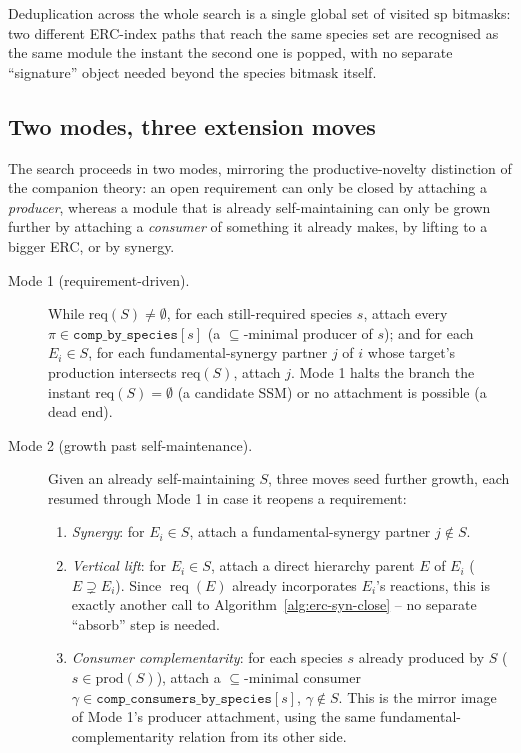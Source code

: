 \documentclass[11pt]{article}
\theoremstyle{plain}
\theoremstyle{remark}
\newcommand{\req}{\operatorname{req}}
\begin{document}
Deduplication across the whole search is a single global set of visited
$\mathrm{sp}$ bitmasks: two different ERC-index paths that reach the same
species set are recognised as the same module the instant the second one
is popped, with no separate ``signature'' object needed beyond the species
bitmask itself.

\subsection{Two modes, three extension moves}
\label{subsec:moves}

The search proceeds in two modes, mirroring the productive-novelty
distinction of the companion theory: an open requirement can only be
closed by attaching a \emph{producer}, whereas a module that is already
self-maintaining can only be grown further by attaching a
\emph{consumer} of something it already makes, by lifting to a bigger
ERC, or by synergy.

\begin{description}
\item[Mode 1 (requirement-driven).] While $\mathrm{req}(S)\neq\emptyset$,
for each still-required species $s$, attach every
$\pi\in\texttt{comp\_by\_species}[s]$ (a $\subseteq$-minimal producer of
$s$); and for each $E_i\in S$, for each fundamental-synergy partner $j$ of
$i$ whose target's production intersects $\mathrm{req}(S)$, attach $j$.
Mode 1 halts the branch the instant $\mathrm{req}(S)=\emptyset$
(a candidate SSM) or no attachment is possible (a dead end).
\item[Mode 2 (growth past self-maintenance).] Given an already
self-maintaining $S$, three moves seed further growth, each resumed
through Mode 1 in case it reopens a requirement:
\begin{enumerate}
\item \emph{Synergy}: for $E_i\in S$, attach a fundamental-synergy
partner $j\notin S$.
\item \emph{Vertical lift}: for $E_i\in S$, attach a direct hierarchy
parent $E$ of $E_i$ ($E\supsetneq E_i$). Since $\req(E)$ already
incorporates $E_i$'s reactions, this is exactly another call to
Algorithm~\ref{alg:erc-syn-close} -- no separate ``absorb'' step is
needed.
\item \emph{Consumer complementarity}: for each species $s$ already
produced by $S$ ($s\in\mathrm{prod}(S)$), attach a $\subseteq$-minimal
consumer $\gamma\in\texttt{comp\_consumers\_by\_species}[s]$,
$\gamma\notin S$. This is the mirror image of Mode 1's producer
attachment, using the same fundamental-complementarity relation from its
other side.
\end{enumerate}
\end{description}
\end{document}
